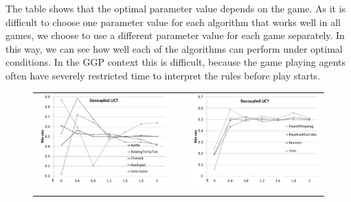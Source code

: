 \documentclass[conference]{IEEEtran}
\begin{document}
The table shows that the optimal parameter value depends on the game. As it is difficult to choose one parameter value 
for each algorithm that works well in all games, we choose to use a different parameter value for each game separately. 
In this way, we can see how well each of the algorithms can perform under optimal conditions. In the GGP context 
this is difficult, because the game playing agents often have severely restricted time to interpret the 
rules before play starts. 

\begin{figure}[t!]
\centering
\begin{tabular}{ccc}
\includegraphics[scale=0.35]{figures/duct1} & ~ & \includegraphics[scale=0.35]{figures/duct2}\\

\end{tabular}
\end{figure}
\end{document}
